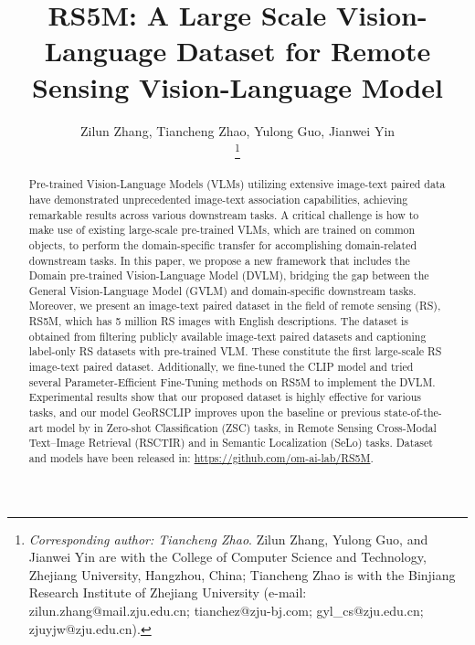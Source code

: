 \documentclass[journal]{IEEEtran}
\begin{document}
\title{RS5M: A Large Scale Vision-Language Dataset for Remote Sensing Vision-Language Model}




\author{
Zilun Zhang, 
Tiancheng Zhao,
Yulong Guo,
Jianwei Yin


\thanks{
\textit{Corresponding author: Tiancheng Zhao}. Zilun Zhang, Yulong Guo, and Jianwei Yin are with the College of Computer Science and Technology, Zhejiang University, Hangzhou, China; Tiancheng Zhao is with the Binjiang Research Institute of Zhejiang University (e-mail: zilun.zhang@mail.zju.edu.cn; tianchez@zju-bj.com; gyl\_cs@zju.edu.cn; zjuyjw@zju.edu.cn).

}
}




\maketitle

\begin{abstract}
  Pre-trained Vision-Language Models (VLMs) utilizing extensive image-text paired data have demonstrated unprecedented image-text association capabilities, achieving remarkable results across various downstream tasks. A critical challenge is how to make use of existing large-scale pre-trained VLMs, which are trained on common objects, to perform the domain-specific transfer for accomplishing domain-related downstream tasks. In this paper, we propose a new framework that includes the Domain pre-trained Vision-Language Model (DVLM), bridging the gap between the General Vision-Language Model (GVLM) and domain-specific downstream tasks. Moreover, we present an image-text paired dataset in the field of remote sensing (RS), RS5M, which has 5 million RS images with English descriptions. The dataset is obtained from filtering publicly available image-text paired datasets and captioning label-only RS datasets with pre-trained VLM. These constitute the first large-scale RS image-text paired dataset. Additionally, we fine-tuned the CLIP model and tried several Parameter-Efficient Fine-Tuning methods on RS5M to implement the DVLM. Experimental results show that our proposed dataset is highly effective for various tasks, and our model GeoRSCLIP improves upon the baseline or previous state-of-the-art model by  in Zero-shot Classification (ZSC) tasks,  in Remote Sensing Cross-Modal Text–Image Retrieval (RSCTIR) and  in Semantic Localization (SeLo) tasks. Dataset and models have been released in: \url{https://github.com/om-ai-lab/RS5M}.
\end{abstract}
\end{document}
